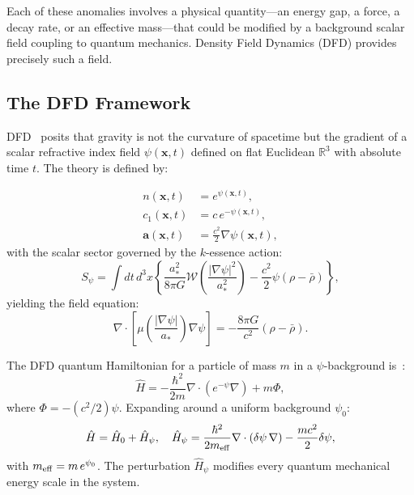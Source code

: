 \documentclass[aps,prb,twocolumn,superscriptaddress,floatfix,nofootinbib,longbibliography]{revtex4-2}
\newcommand{\avec}{\mathbf{a}}
\newcommand{\astar}{a_*}
\newcommand{\Wfunc}{\mathcal{W}}
\newcommand{\Phipot}{\Phi}
\begin{document}
Each of these anomalies involves a physical quantity---an energy gap, a
force, a decay rate, or an effective mass---that could be modified by a
background scalar field coupling to quantum mechanics.  Density Field
Dynamics (DFD) provides precisely such a field.

\subsection{The DFD Framework}

DFD~\cite{Alcock2025DFD} posits that gravity is not the curvature of
spacetime but the gradient of a scalar refractive index field
$\psi(\mathbf{x},t)$ defined on flat Euclidean $\mathbb{R}^3$ with
absolute time $t$.  The theory is defined by:

\begin{align}
n(\mathbf{x},t) &= e^{\psi(\mathbf{x},t)}, \label{eq:n-def}\\
c_1(\mathbf{x},t) &= c\,e^{-\psi(\mathbf{x},t)}, \label{eq:c1-def}\\
\avec(\mathbf{x},t) &= \frac{c^2}{2}\nabla\psi(\mathbf{x},t),
\label{eq:a-def}
\end{align}
with the scalar sector governed by the $k$-essence action:
\begin{equation}
S_\psi = \int dt\,d^3x\left\{
  \frac{\astar^2}{8\pi G}\Wfunc\!\left(\frac{|\nabla\psi|^2}{\astar^2}\right)
  - \frac{c^2}{2}\psi(\rho - \bar{\rho})
\right\},
\label{eq:action}
\end{equation}
yielding the field equation:
\begin{equation}
\nabla\cdot\!\left[\mu\!\left(\frac{|\nabla\psi|}{\astar}\right)
\nabla\psi\right] = -\frac{8\pi G}{c^2}(\rho - \bar{\rho}).
\label{eq:field-eq}
\end{equation}

The DFD quantum Hamiltonian for a particle of mass $m$ in a
$\psi$-background is~\cite{Alcock2025Quantum}:
\begin{equation}
\hat{H} = -\frac{\hbar^2}{2m}\nabla\cdot\!\left(e^{-\psi}\nabla\right)
+ m\Phipot,
\label{eq:H-quantum}
\end{equation}
where $\Phipot = -(c^2/2)\psi$.  Expanding around a uniform background
$\psi_0$:
\begin{equation}
\hat{H} = \hat{H}_0 + \hat{H}_\psi, \quad
\hat{H}_\psi = \frac{\hbar^2}{2m_{\rm eff}}\nabla\cdot(\delta\psi\,\nabla)
- \frac{mc^2}{2}\delta\psi,
\label{eq:H-psi}
\end{equation}
with $m_{\rm eff} = m\,e^{\psi_0}$.  The perturbation $\hat{H}_\psi$
modifies every quantum mechanical energy scale in the system.
\end{document}
